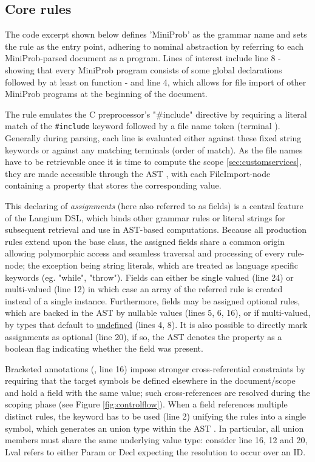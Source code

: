\subsection*{Core rules}

The code excerpt shown below defines 'MiniProb' as the grammar name and sets the  rule as the entry point, adhering to nominal abstraction by
referring to each MiniProb-parsed document as a program. Lines of interest include line 8 - showing that every MiniProb program consists of some global declarations
followed by at least on function - and line 4, which allows for file import of other MiniProb programs at the beginning of the document.

The  rule emulates the C preprocessor's "\#include" directive by requiring a literal match of the \texttt{\#include} keyword followed by a
file name token (terminal ). Generally during parsing, each line is evaluated either against these fixed string keywords or against any matching terminals (order of match).
As the file names have to be retrievable once it is time to compute the scope \ref{sec:customservices}, they are made accessible through the AST
, with each FileImport-node containing a  property that stores the corresponding value.

This declaring of \textit{assignments} (here also referred to as fields) is a central feature of the Langium DSL, which binds other grammar rules or literal strings for subsequent retrieval and use in AST-based computations.
Because all production rules extend upon the  base class, the assigned fields share a common origin allowing polymorphic access and seamless traversal and processing of every rule-node;
the exception being string literals, which are treated as language specific keywords (eg. "while", "throw"). Fields can either be single valued (line 24) or multi-valued (line 12)
in which case an array of the referred rule is created instead of a single instance.
Furthermore, fields may be assigned optional rules, which are backed in the AST by nullable values (lines 5, 6, 16), or if multi-valued,
by types that default to \underline{undefined} (lines 4, 8). It is also possible to directly mark assignments as optional (line 20), if so,
the AST denotes the property as a boolean flag indicating whether the field was present.

Bracketed annotations (, line 16) impose stronger cross-referential constraints by requiring
that the target symbols be defined elsewhere in the document/scope and hold a field with the same value; such cross-references are resolved during the scoping phase (see Figure \ref{fig:controlflow}).
When a field references multiple distinct rules, the  keyword has to be used (line 2) unifying the rules into a single symbol, which generates an union type within the AST \cite{typescript-unions-intersections}.
In particular, all union members must share the same underlying value type: consider line 16, 12 and 20, Lval refers to either Param or Decl expecting the resolution to occur
over an ID.

